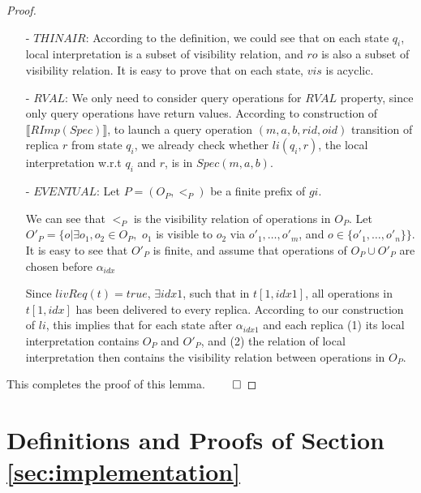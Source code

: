 {\begin {proof}
\begin{itemize}
    If $\neg \exists o'$, such that $o' <_{gi} o$, then it is easy to see that $o$ is the first operation of its replica and no operation is delivered to that replica before $o$. In this case, it is obvious that $<^{-1}_{gi}(o)$ is finite.

\item[-] $\textit{THINAIR}$: According to the definition, we could see that on each state $q_i$, local interpretation is a subset of visibility relation, and $ro$ is also a subset of visibility relation. It is easy to prove that on each state, $vis$ is acyclic.

\item[-] $\textit{RVAL}$: We only need to consider query operations for $\textit{RVAL}$ property, since only query operations have return values. According to construction of $\llbracket RImp(Spec) \rrbracket$, to launch a query operation $(m,a,b,rid,oid)$ transition of replica $r$ from state $q_i$, we already check whether $li(q_i,r)$, the local interpretation w.r.t $q_i$ and $r$, is in $Spec(m,a,b)$.

\item[-] $\textit{EVENTUAL}$: Let $P=(O_P,<_P)$ be a finite prefix of $gi$.

We can see that $<_P$ is the visibility relation of operations in $O_P$. Let $O'_P = \{ o \vert \exists o_1,o_2 \in O_P,$ $o_1$ is visible to $o_2$ via $o'_1,\ldots,o'_m$, and $o \in \{ o'_1,\ldots,o'_n \} \}$. It is easy to see that $O'_P$ is finite, and assume that operations of $O_P \cup O'_P$ are chosen before $\alpha_{idx}$

Since $livReq(t)=true$, $\exists idx1$, such that in $t[1,idx1]$, all operations in $t[1,idx]$ has been delivered to every replica. According to our construction of $li$, this implies that for each state after $\alpha_{idx1}$ and each replica (1) its local interpretation contains $O_P$ and $O'_P$, and (2) the relation of local interpretation then contains the visibility relation between operations in $O_P$.
\end{itemize}

This completes the proof of this lemma. $\qed$
\end {proof}








\section{Definitions and Proofs of Section \ref{sec:implementation}}
\label{sec:appendix definitions and proofs of section implementation}



}

